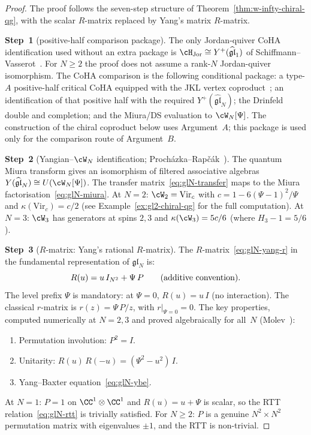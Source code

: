 \begin{proof}
The proof follows the seven-step structure of
Theorem~\ref{thm:w-infty-chiral-qg}, with the scalar
$R$-matrix replaced by Yang's matrix $R$-matrix.

\medskip
\noindent
\textbf{Step~1}
(positive-half comparison package).
The only Jordan-quiver CoHA identification used without an
extra package is
$\cH_{\mathrm{Jor}}\cong
Y^+(\widehat{\mathfrak{gl}}_1)$
of Schiffmann--Vasserot~\cite{SV13}. For $N \geq 2$ the proof
does not assume a rank-$N$ Jordan-quiver isomorphism. The CoHA
comparison is the following conditional package: a type-$A$
positive-half critical CoHA equipped with the JKL vertex
coproduct~\cite{JKL26}; an identification of that positive half
with the required $Y^+(\widehat{\mathfrak{gl}}_N)$; the
Drinfeld double and completion; and the Miura/DS evaluation to
\(\cW_N[\Psi]\). The construction of the chiral coproduct below
uses Argument~$A$; this package is used only for the comparison
route of Argument~$B$.

\medskip
\noindent
\textbf{Step~2}
(Yangian--$\cW_N$ identification;
Proch\'azka--Rap\v{c}\'ak~\cite{PR19}).
The quantum Miura transform gives an isomorphism of
filtered associative algebras
$Y(\widehat{\mathfrak{gl}}_N) \cong U(\cW_N[\Psi])$.
The transfer matrix~\eqref{eq:glN-transfer}
maps to the Miura
factorisation~\eqref{eq:glN-miura}.
At $N = 2$: $\cW_2 = \mathrm{Vir}_c$ with
$c = 1 - 6(\Psi - 1)^2/\Psi$ and
$\kappa(\mathrm{Vir}_c) = c/2$
(see Example~\ref{ex:gl2-chiral-qg} for the full computation).
At $N = 3$: $\cW_3$ has generators at spins $2, 3$ and
$\kappa(\cW_3) = 5c/6$ (where $H_3 - 1 = 5/6$).

\medskip
\noindent
\textbf{Step~3}
($R$-matrix: Yang's rational $R$-matrix).
The $R$-matrix~\eqref{eq:glN-yang-r} in the fundamental
representation of $\mathfrak{gl}_N$ is:
\[
 R(u) = u\, I_{N^2} + \Psi\, P
 \qquad \textup{(additive convention)}.
\]
The level prefix $\Psi$ is mandatory: at $\Psi = 0$,
$R(u) = u\, I$ (no interaction). The classical
$r$-matrix is $r(z) = \Psi\, P/z$, with
$r|_{\Psi = 0} = 0$.
The key properties, computed numerically at $N = 2, 3$ and
proved algebraically for all~$N$
(Molev~\cite{Molev07}):
\begin{enumerate}[label=\textup{(\roman*)}]
\item Permutation involution: $P^2 = I$.
\item Unitarity: $R(u)\, R(-u) = (\Psi^2 - u^2)\, I$.
\item Yang--Baxter equation~\eqref{eq:glN-ybe}.
\end{enumerate}
At $N = 1$: $P = 1$ on $\CC^1 \otimes \CC^1$ and
$R(u) = u + \Psi$ is scalar, so the RTT
relation~\eqref{eq:glN-rtt} is trivially satisfied.
For $N \geq 2$: $P$ is a genuine $N^2 \times N^2$
permutation matrix with eigenvalues $\pm 1$, and the
RTT is non-trivial.


\end{proof}
